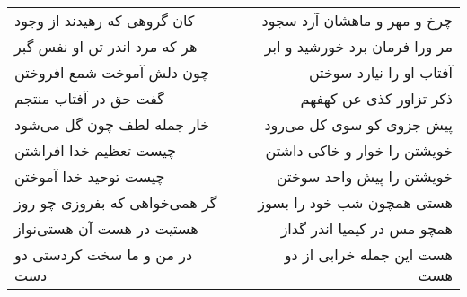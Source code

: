 \begin{center}
\begin{longtable}{l p{0.5cm} r}
کان گروهی که رهیدند از وجود
&&
چرخ و مهر و ماهشان آرد سجود
\\
هر که مرد اندر تن او نفس گبر
&&
مر ورا فرمان برد خورشید و ابر
\\
چون دلش آموخت شمع افروختن
&&
آفتاب او را نیارد سوختن
\\
گفت حق در آفتاب منتجم
&&
ذکر تزاور کذی عن کهفهم
\\
خار جمله لطف چون گل می‌شود
&&
پیش جزوی کو سوی کل می‌رود
\\
چیست تعظیم خدا افراشتن
&&
خویشتن را خوار و خاکی داشتن
\\
چیست توحید خدا آموختن
&&
خویشتن را پیش واحد سوختن
\\
گر همی‌خواهی که بفروزی چو روز
&&
هستی همچون شب خود را بسوز
\\
هستیت در هست آن هستی‌نواز
&&
همچو مس در کیمیا اندر گداز
\\
در من و ما سخت کردستی دو دست
&&
هست این جمله خرابی از دو هست
\\
\end{longtable}
\end{center}

